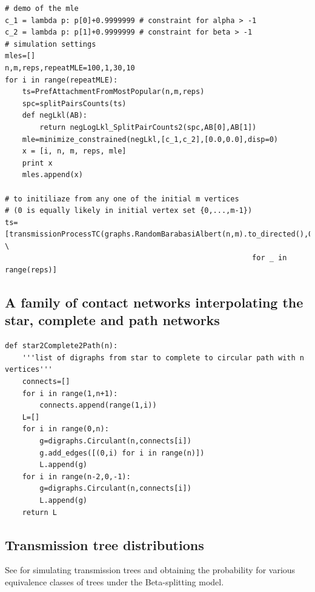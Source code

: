 \documentclass[review]{elsarticle}
\numberwithin{equation}{section}
\begin{document}
{\begin{verbatim}
# demo of the mle  
c_1 = lambda p: p[0]+0.9999999 # constraint for alpha > -1
c_2 = lambda p: p[1]+0.9999999 # constraint for beta > -1
# simulation settings
mles=[]
n,m,reps,repeatMLE=100,1,30,10
for i in range(repeatMLE):
    ts=PrefAttachmentFromMostPopular(n,m,reps)
    spc=splitPairsCounts(ts)
    def negLkl(AB):
        return negLogLkl_SplitPairCounts2(spc,AB[0],AB[1])
    mle=minimize_constrained(negLkl,[c_1,c_2],[0.0,0.0],disp=0)
    x = [i, n, m, reps, mle]
    print x
    mles.append(x)

# to initiliaze from any one of the initial m vertices 
# (0 is equally likely in initial vertex set {0,...,m-1})
ts=[transmissionProcessTC(graphs.RandomBarabasiAlbert(n,m).to_directed(),0) \
                                                         for _ in range(reps)]
\end{verbatim}
}

\subsection{A family of contact networks interpolating the star, complete and path networks}\label{Sec:codeD}
{\scriptsize
\begin{verbatim}
def star2Complete2Path(n):
    '''list of digraphs from star to complete to circular path with n vertices'''
    connects=[]
    for i in range(1,n+1):
        connects.append(range(1,i))
    L=[]
    for i in range(0,n):
        g=digraphs.Circulant(n,connects[i])
        g.add_edges([(0,i) for i in range(n)])
        L.append(g)
    for i in range(n-2,0,-1):
        g=digraphs.Circulant(n,connects[i])
        L.append(g)
    return L
\end{verbatim}
}

\subsection{Transmission tree distributions}
See \cite[Appendix: Algorithms]{SainudiinVeber2016} for simulating transmission trees and obtaining the probability for various equivalence classes of trees under the Beta-splitting model.
\end{document}
